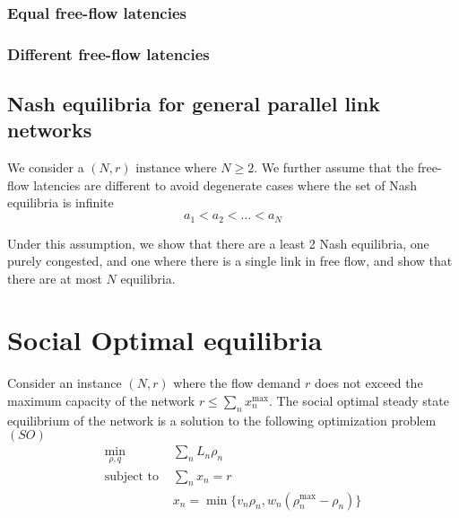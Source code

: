 \subsubsection{Equal free-flow latencies}

\subsubsection{Different free-flow latencies}


\subsection{Nash equilibria for general parallel link networks}
We consider a $(N, r)$ instance where $N \geq 2$. We further assume that the free-flow latencies are different to avoid degenerate cases where the set of Nash equilibria is infinite
\[
a_1 < a_2 < \dots < a_N
\]

Under this assumption, we show that there are a least 2 Nash equilibria, one purely congested, and one where there is a single link in free flow, and show that there are at most $N$ equilibria.





\section{Social Optimal equilibria}
Consider an instance $(N, r)$ where the flow demand $r$ does not exceed the maximum capacity of the network $r \leq \sum_n x_n^{\max}$. The social optimal steady state equilibrium of the network is a solution to the following optimization problem $(SO)$
\begin{align*}
\min_{\rho, q}  &\sum_n L_n \rho_n\\
\text{subject to }
& \sum_n x_n = r\\
& x_n = \min \{ v_n \rho_n, w_n(\rho_n^{\max} - \rho_n )\}
\end{align*}


